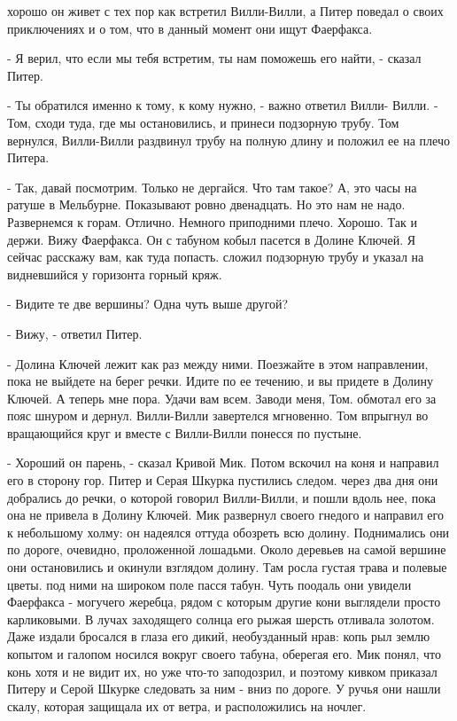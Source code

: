 хорошо он живет с тех пор как встретил Вилли-Вилли, а Питер поведал о 
своих приключениях и о том, что в данный момент они ищут Фаерфакса.
\par- Я верил, что если мы тебя встретим, ты нам поможешь его найти, - 
сказал Питер.
\par- Ты обратился именно к тому, к кому нужно, - важно ответил Вилли-
Вилли. - Том, сходи туда, где мы остановились, и принеси подзорную 
трубу.
 Том вернулся, Вилли-Вилли раздвинул трубу на полную длину и 
положил ее на плечо Питера.
\par- Так, давай посмотрим. Только не дергайся. Что там такое? А, это 
часы на ратуше в Мельбурне. Показывают ровно двенадцать. Но это нам не 
надо. Развернемся к горам. Отлично. Немного приподними плечо. Хорошо. 
Так и держи. Вижу Фаерфакса. Он с табуном кобыл пасется в Долине 
Ключей. Я сейчас расскажу вам, как туда попасть.
 сложил подзорную трубу и указал на видневшийся у горизонта 
горный кряж.
\par- Видите те две вершины? Одна чуть выше другой?
\par- Вижу, - ответил Питер.
\par- Долина Ключей лежит как раз между ними. Поезжайте в этом 
направлении, пока не выйдете на берег речки. Идите по ее течению, и вы 
придете в Долину Ключей. А теперь мне пора. Удачи вам всем. Заводи 
меня, Том.
 обмотал его за пояс шнуром и дернул. Вилли-Вилли завертелся 
мгновенно. Том впрыгнул во вращающийся круг и вместе с Вилли-Вилли 
понесся по пустыне.
\par- Хороший он парень, - сказал Кривой Мик. Потом вскочил на коня и 
направил его в сторону гор. Питер и Серая Шкурка пустились следом.
 через два дня они добрались до речки, о которой говорил 
Вилли-Вилли, и пошли вдоль нее, пока она не привела в Долину Ключей.
 Мик развернул своего гнедого и направил его к небольшому 
холму: он надеялся оттуда обозреть всю долину. Поднимались они по 
дороге, очевидно, проложенной лошадьми. Около деревьев на самой 
вершине они остановились и окинули взглядом долину. Там росла густая 
трава и полевые цветы.
 под ними на широком поле пасся табун. Чуть поодаль они 
увидели Фаерфакса - могучего жеребца, рядом с которым другие кони 
выглядели просто карликовыми. В лучах заходящего солнца его рыжая 
шерсть отливала золотом. Даже издали бросался в глаза его дикий, 
необузданный нрав: копь рыл землю копытом и галопом носился вокруг 
своего табуна, оберегая его.
 Мик понял, что конь хотя и не видит их, но уже что-то 
заподозрил, и поэтому кивком приказал Питеру и Серой Шкурке следовать 
за ним - вниз по дороге. У ручья они нашли скалу, которая защищала их 
от ветра, и расположились на ночлег.
